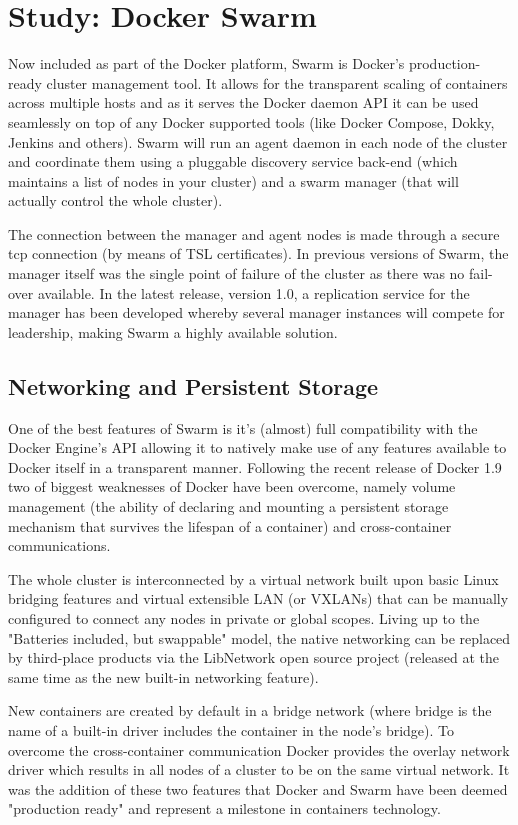 \documentclass{article}
\begin{document}
\section{Study: Docker Swarm}
Now included as part of the Docker platform, Swarm is Docker's production-ready cluster management tool. It allows for the transparent scaling of containers across multiple hosts and as it serves the Docker daemon API it can be used seamlessly on top of any Docker supported tools (like Docker Compose, Dokky, Jenkins and others)\citep{swarm manual}.
Swarm will run an agent daemon in each node of the cluster and coordinate them using a pluggable discovery service back-end (which maintains a list of nodes in your cluster) and a swarm manager (that will actually control the whole cluster). 
\par
The connection between the manager and agent nodes is made through a secure tcp connection (by means of TSL certificates). 
In previous versions of Swarm, the manager itself was the single point of failure of the cluster as there was no fail-over available. 
In the latest release, version 1.0, a replication service for the manager has been developed whereby several manager instances will compete for leadership, making Swarm a highly available solution.
\subsection{Networking and Persistent Storage}
One of the best features of Swarm is it's (almost) full compatibility with the Docker Engine's API allowing it to natively make use of any features available to Docker itself in a transparent manner. Following the recent release of Docker 1.9 two of biggest weaknesses of Docker have been overcome, namely volume management (the ability of declaring and mounting a persistent storage mechanism that survives the lifespan of a container) and cross-container communications.
\par
The whole cluster is interconnected by a virtual network built upon basic Linux bridging features and virtual extensible LAN (or VXLANs) that can be manually configured to connect any nodes in private or global scopes. Living up to the "Batteries included, but swappable" model, the native networking can be replaced by third-place products via the LibNetwork open source project (released at the same time as the new built-in networking feature)\citep{Butler}.
\par
New containers are created by default in a bridge network (where bridge is the name of a built-in driver includes the container in the node's bridge). To overcome the cross-container communication Docker provides the overlay network driver which results in all nodes of a cluster to be on the same virtual network. It was the addition of these two features that Docker and Swarm have been deemed "production ready" and represent a milestone in containers technology\citep{milestone}.
\end{document}

